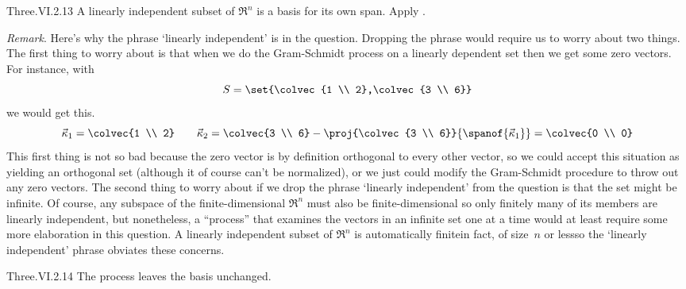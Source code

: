 \begin{ans}{Three.VI.2.13}
       A linearly independent subset of $\Re^n$ is a basis for its
       own span.
       Apply .

       \textit{Remark}.
       Here's why the phrase `linearly independent' is in the question.
       Dropping the phrase would require us to worry about two things.
       The first thing to worry about is that
       when we do the Gram-Schmidt process on a linearly dependent
       set then we get some zero vectors.
       For instance, with
       \begin{equation*}
         S=\set{\colvec{1 \\ 2},\colvec{3 \\ 6}}
       \end{equation*}
       we would get this.
       \begin{equation*}
         \vec{\kappa}_1   =   \colvec{1 \\ 2}
         \qquad
         \vec{\kappa}_2
           =
           \colvec{3 \\ 6}-\proj{\colvec{3 \\ 6}}{\spanof{\vec{\kappa}_1}}
           =
           \colvec{0 \\ 0}
       \end{equation*}
       This first thing is not so bad because
       the zero vector is by definition orthogonal to every other vector,
       so we could accept this situation
       as yielding an orthogonal set (although
       it of course can't be normalized), or we just could modify the
       Gram-Schmidt procedure to throw out any zero vectors.
       The second thing to worry about if we drop the phrase
       `linearly independent' from the question is that the set might
       be infinite.
       Of course, any subspace of the finite-dimensional $\Re^n$
       must also be finite-dimensional so only finitely many of its
       members are linearly independent, but nonetheless,
       a ``process'' that examines the vectors in an infinite set one at a
       time would at least require some more elaboration in this question.
       A linearly independent subset of $\Re^n$ is automatically
       finite\Dash in fact, of
       size~$n$ or less\Dash so the `linearly independent'
       phrase obviates these concerns.
     
\end{ans}
\begin{ans}{Three.VI.2.14}
       The process leaves the basis unchanged.
     
\end{ans}
